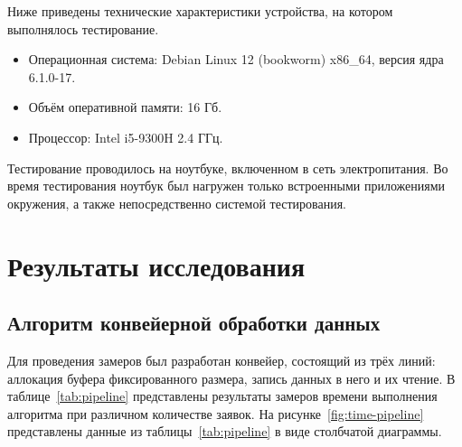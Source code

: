 
Ниже приведены технические характеристики устройства, на котором выполнялось тестирование.

\begin{itemize}[label*=---]
	\item Операционная система: Debian Linux 12 (bookworm) x86\_64, версия ядра 6.1.0-17.
	\item Объём оперативной памяти: 16 Гб.
	\item Процессор: Intel i5-9300H 2.4 ГГц.
\end{itemize}

Тестирование проводилось на ноутбуке, включенном в сеть электропитания. Во время тестирования ноутбук был нагружен только встроенными приложениями окружения, а также непосредственно системой тестирования.



\section{Результаты исследования}

\subsection*{Алгоритм конвейерной обработки данных}

Для проведения замеров был разработан конвейер, состоящий из трёх линий: аллокация буфера фиксированного размера, запись данных в него и их чтение. В таблице~\ref{tab:pipeline} представлены результаты замеров времени выполнения алгоритма при различном количестве заявок. На рисунке~\ref{fig:time-pipeline} представлены данные из таблицы~\ref{tab:pipeline} в виде столбчатой диаграммы.

